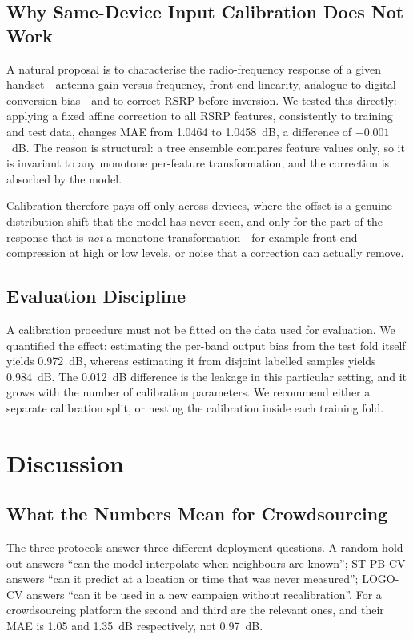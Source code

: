 \documentclass{ieeeaccess}
\begin{document}
\subsection{Why Same-Device Input Calibration Does Not Work}
A natural proposal is to characterise the radio-frequency response of a given
handset---antenna gain versus frequency, front-end linearity, analogue-to-digital
conversion bias---and to correct RSRP before inversion. We tested this directly:
applying a fixed affine correction to all RSRP features, consistently to training
and test data, changes MAE from 1.0464 to 1.0458~dB, a difference of
$-0.001$~dB. The reason is structural: a tree ensemble compares feature values
only, so it is invariant to any monotone per-feature transformation, and the
correction is absorbed by the model.

Calibration therefore pays off only across devices, where the offset is a genuine
distribution shift that the model has never seen, and only for the part of the
response that is \emph{not} a monotone transformation---for example front-end
compression at high or low levels, or noise that a correction can actually remove.

\subsection{Evaluation Discipline}
A calibration procedure must not be fitted on the data used for evaluation. We
quantified the effect: estimating the per-band output bias from the test fold
itself yields 0.972~dB, whereas estimating it from disjoint labelled samples
yields 0.984~dB. The 0.012~dB difference is the leakage in this particular
setting, and it grows with the number of calibration parameters. We recommend
either a separate calibration split, or nesting the calibration inside each
training fold.

\section{Discussion}
\label{sec:discussion}

\subsection{What the Numbers Mean for Crowdsourcing}
The three protocols answer three different deployment questions. A random
hold-out answers ``can the model interpolate when neighbours are known''; ST-PB-CV
answers ``can it predict at a location or time that was never measured''; LOGO-CV
answers ``can it be used in a new campaign without recalibration''. For a
crowdsourcing platform the second and third are the relevant ones, and their MAE
is 1.05 and 1.35~dB respectively, not 0.97~dB.
\end{document}
